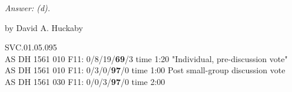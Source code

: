 	
\emph{Answer: (d).}

	by David A. Huckaby

SVC.01.05.095 \\
AS DH 1561 010 F11: 0/8/19/{\bf69}/3 time 1:20 "Individual, pre-discussion vote" \\
AS DH 1561 010 F11: 0/3/0/{\bf97}/0 time 1:00 Post small-group discussion vote \\
AS DH 1561 030 F11: 0/0/3/{\bf97}/0 time 2:00  \\
